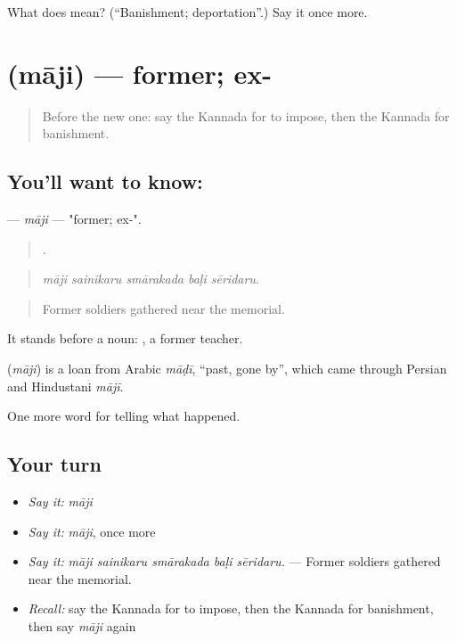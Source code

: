 \begin{tcolorbox}[breakable,colback=teal!4,colframe=teal!35!black,title={Before you move on}]
What does  mean? (\textquotedblleft{}Banishment; deportation\textquotedblright{}.) Say it once more.
\end{tcolorbox}
\section[\texorpdfstring{\kn{ಮಾಜಿ} (māji)}{ಮಾಜಿ (māji)}]{ (māji) — former; ex-}

\label{lesson:KA-C372-maji}



\begin{quote}
Before the new one: say the Kannada for to impose, then the Kannada for banishment.
\end{quote}

\subsection*{You'll want to know: }
\textbf{} — \emph{māji} — "former; ex-".

\begin{quote}
    .
\end{quote}

\begin{quote}
\emph{māji sainikaru smārakada baḷi sēridaru.}
\end{quote}

\begin{quote}
Former soldiers gathered near the memorial.
\end{quote}

It stands before a noun:  , a former teacher.

\begin{cousinweb}
\textbf{} (\emph{māji}) is a loan from Arabic \emph{māḍī}, \textquotedblleft{}past, gone by\textquotedblright{}, which came through Persian and Hindustani \emph{mājī}.
\end{cousinweb}

\begin{grammarlens}[title={What you've built}]
One more word for telling what happened.
\end{grammarlens}

\subsection*{Your turn}
\begin{itemize}
\raggedright
  \item \emph{Say it:} \emph{māji}
  \item \emph{Say it:} \emph{māji}, once more
  \item \emph{Say it:} \emph{māji sainikaru smārakada baḷi sēridaru.} — Former soldiers gathered near the memorial.
  \item \emph{Recall:} say the Kannada for to impose, then the Kannada for banishment, then say \emph{māji} again
\end{itemize}

